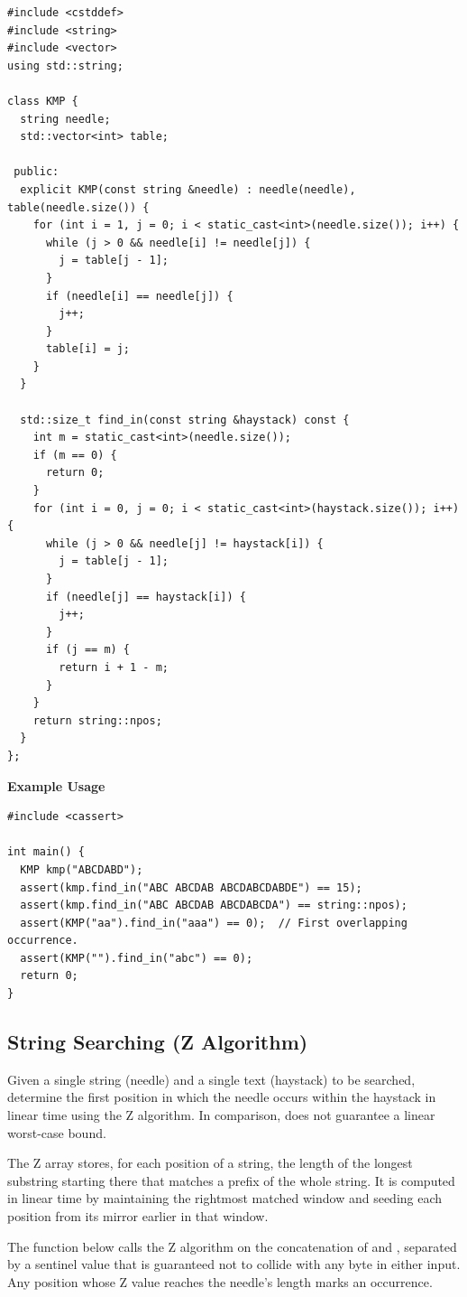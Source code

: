 \begin{lstlisting}[style=cpp]
#include <cstddef>
#include <string>
#include <vector>
using std::string;

class KMP {
  string needle;
  std::vector<int> table;

 public:
  explicit KMP(const string &needle) : needle(needle), table(needle.size()) {
    for (int i = 1, j = 0; i < static_cast<int>(needle.size()); i++) {
      while (j > 0 && needle[i] != needle[j]) {
        j = table[j - 1];
      }
      if (needle[i] == needle[j]) {
        j++;
      }
      table[i] = j;
    }
  }

  std::size_t find_in(const string &haystack) const {
    int m = static_cast<int>(needle.size());
    if (m == 0) {
      return 0;
    }
    for (int i = 0, j = 0; i < static_cast<int>(haystack.size()); i++) {
      while (j > 0 && needle[j] != haystack[i]) {
        j = table[j - 1];
      }
      if (needle[j] == haystack[i]) {
        j++;
      }
      if (j == m) {
        return i + 1 - m;
      }
    }
    return string::npos;
  }
};
\end{lstlisting}
\textbf{Example Usage}\par
\begin{lstlisting}[style=cpp]
#include <cassert>

int main() {
  KMP kmp("ABCDABD");
  assert(kmp.find_in("ABC ABCDAB ABCDABCDABDE") == 15);
  assert(kmp.find_in("ABC ABCDAB ABCDABCDA") == string::npos);
  assert(KMP("aa").find_in("aaa") == 0);  // First overlapping occurrence.
  assert(KMP("").find_in("abc") == 0);
  return 0;
}
\end{lstlisting}
\subsection{String Searching (Z Algorithm)}
\label{sec:3.3.2}
Given a single string (needle) and a single text (haystack) to be searched, determine the first position in which the needle occurs within the haystack in linear time using the Z algorithm. In comparison,  does not guarantee a linear worst-case bound.

The Z array stores, for each position of a string, the length of the longest substring starting there that matches a prefix of the whole string. It is computed in linear time by maintaining the rightmost matched window and seeding each position from its mirror earlier in that window.

The  function below calls the Z algorithm on the concatenation of  and , separated by a sentinel value that is guaranteed not to collide with any byte in either input. Any position whose Z value reaches the needle's length marks an occurrence.

